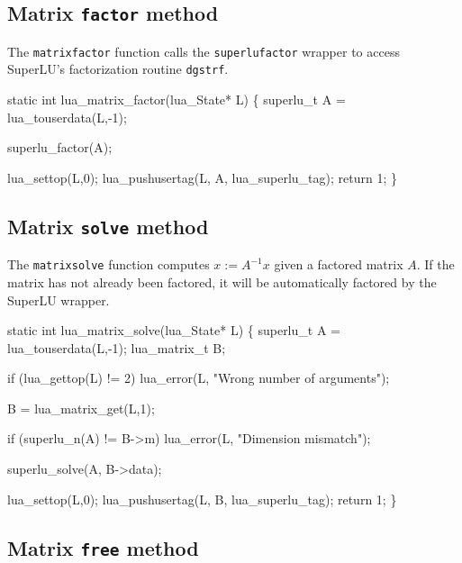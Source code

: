 \subsection{Matrix {\tt{}factor} method}

The {\tt{}matrix{}factor} function calls the {\tt{}superlu{}factor}
wrapper to access SuperLU's factorization routine {\tt{}dgstrf}. %

\nwenddocs{}\plusendmoddef
static int lua_matrix_factor(lua_State* L)
\{
    superlu_t A = lua_touserdata(L,-1);

    superlu_factor(A);

    lua_settop(L,0);
    lua_pushusertag(L, A, lua_superlu_tag);
    return 1;
\}

\nwendcode{}\nwdocspar


\subsection{Matrix {\tt{}solve} method}

The {\tt{}matrix{}solve} function computes $x := A^{-1} x$ given a factored
matrix $A$.  If the matrix has not already been factored, it will
be automatically factored by the SuperLU wrapper.

\nwenddocs{}\plusendmoddef
static int lua_matrix_solve(lua_State* L)
\{
    superlu_t A = lua_touserdata(L,-1);
    lua_matrix_t B;

    if (lua_gettop(L) != 2)
        lua_error(L, "Wrong number of arguments");

    B = lua_matrix_get(L,1);

    if (superlu_n(A) != B->m)
        lua_error(L, "Dimension mismatch");

    superlu_solve(A, B->data);

    lua_settop(L,0);
    lua_pushusertag(L, B, lua_superlu_tag);
    return 1;
\}

\nwendcode{}\nwdocspar


\subsection{Matrix {\tt{}free} method}

